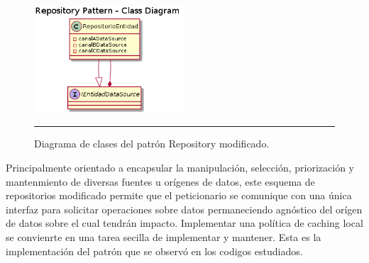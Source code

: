  \begin{figure}[htbp]
 	\centering
 	\includegraphics[width=0.5\textwidth]{Figures/uml_clases_modif_repository.png}
 	\rule{35em}{1pt}
 	\caption[Modified Repository Pattern Class Diagram]{Diagrama de clases del patrón Repository modificado.}
 	\label{fig:uml_clases_modif_repository}
 \end{figure}

Principalmente orientado a encapsular la manipulación, selección, priorización y mantenmiento de diversas fuentes u orígenes de datos, este esquema de repositorios modificado permite que el peticionario se comunique con una única interfaz para solicitar operaciones sobre datos permaneciendo agnóstico del orígen de datos sobre el cual tendrán impacto. 
Implementar una política de caching local se convienrte en una tarea secilla de implementar y mantener.
Esta es la implementación del patrón que se observó en los codigos estudiados.
% 
